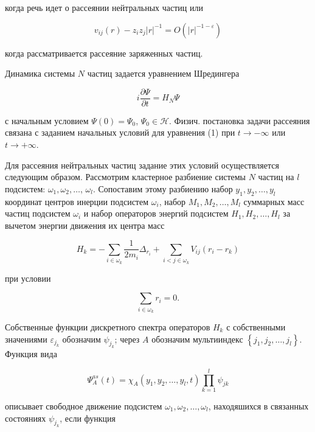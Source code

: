 \documentclass[10pt]{article}
\begin{document}
когда речь идет о рассеянии нейтральных частиц или



\[

v_{i j}(r)-z_{i} z_{j}|r|^{-1}=O\left(|r|^{-1-\varepsilon}\right)

\]



когда рассматривается рассеяние заряженных частиц.



Динамика системы $N$ частиц задается уравнением Шредингера



\[

i \frac{\partial \Psi}{\partial t}=H_{N} \Psi

\]



с начальным условием $\Psi(0)=\Psi_{0}$, $\Psi_{0} \in \mathscr{H}$. Физич. постановка задачи рассеяния связана с заданием начальных условий для уравнения (1) при $t \rightarrow-\infty$ или $t \rightarrow+\infty$.



Для рассеяния нейтральных частиц задание этих условий осуществляется следующим образом. Рассмотрим кластерное разбиение системы $N$ частиц на $l$ подсистем: $\omega_{1}, \omega_{2}, \ldots$, $\omega_{l}$. Сопоставим этому разбиению набор $y_{1}, y_{2}, \ldots, y_{l}$ координат центров инерции подсистем $\omega_{i}$, набор $M_{1}, M_{2}, \ldots, M_{l}$ суммарных масс частиц подсистем $\omega_{i}$ и набор операторов энергий подсистем $H_{1}, H_{2}, \ldots, H_{l}$ за вычетом энергии движения их центра масс



\[

H_{k}=-\sum_{i \in \omega_{k}} \frac{1}{2 m_{i}} \Delta_{r_{i}}+\sum_{i<j \in \omega_{k}} V_{i j}\left(r_{i}-r_{k}\right)

\]



при условии



\[

\sum_{i \in \omega_{k}} r_{i}=0 .

\]



Собственные функции дискретного спектра операторов $H_{k}$ с собственными значениями $\varepsilon_{j_{k}}$ обозначим $\psi_{j_{k}}$; через $A$ обозначим мультииндекс $\left\{j_{1}, j_{2}, \ldots, j_{l}\right\}$. Функция вида



\[

\Psi_{A}^{a s}(t)=\chi_{A}\left(y_{1}, y_{2}, \ldots, y_{l}, t\right) \prod_{k=1}^{l} \psi_{j k}

\]



описывает свободное движение подсистем $\omega_{1}, \omega_{2}, \ldots, \omega_{l}$, находяшихся в связанных состояниях $\psi_{j_{k}}$, если функция
\end{document}

